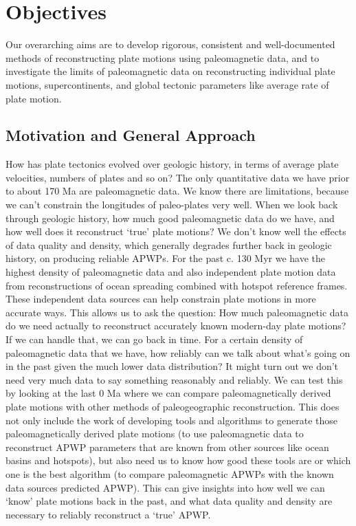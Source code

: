 \section{Objectives}

Our overarching aims are to develop rigorous, consistent and well-documented
methods of reconstructing plate motions using paleomagnetic data, and to
investigate the limits of paleomagnetic data on reconstructing individual plate
motions, supercontinents, and global tectonic parameters like average rate of
plate motion.

\subsection{Motivation and General Approach}

How has plate tectonics evolved over geologic history, in terms of average plate
velocities, numbers of plates and so on? The only quantitative data we have
prior to about 170 Ma are paleomagnetic data. We know there are limitations,
because we can't constrain the longitudes of paleo-plates very well. When we
look back through geologic history, how much good paleomagnetic data do we have,
and how well does it reconstruct `true' plate motions? We don't know well the
effects of data quality and density, which generally degrades further back in
geologic history, on producing reliable APWPs. For the past c. 130
Myr we have the highest density of paleomagnetic data and also independent plate
motion data from reconstructions of ocean spreading combined with hotspot
reference frames. These independent data sources can help constrain plate
motions in more accurate ways. This allows us to ask the question: How much
paleomagnetic data do we need actually to reconstruct accurately known
modern-day plate motions? If we can handle that, we can go back in time. For a
certain density of paleomagnetic data that we have, how reliably can we talk
about what's going on in the past given the much lower data distribution? It
might turn out we don't need very much data to say something reasonably and
reliably. We can test this by looking at the last 0 Ma where we
can compare paleomagnetically derived plate motions with other methods of
paleogeographic reconstruction. This does not only include the work of
developing tools and algorithms to generate those paleomagnetically derived
plate motions (to use paleomagnetic data to reconstruct APWP parameters that are
known from other sources like ocean basins and hotspots), but also need us to
know how good these tools are or which one is the best algorithm (to compare
paleomagnetic APWPs with the known data sources predicted APWP). This can give
insights into how well we can `know' plate motions back in the past, and what
data quality and density are necessary to reliably reconstruct a `true' APWP\@.

